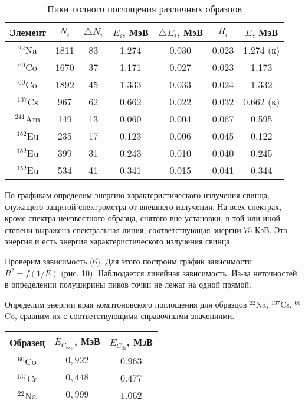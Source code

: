\begin{table}[h]
\begin{center}
  \caption{Пики полного поглощения различных образцов}
  \label{tab:my_label}
  \begin{tabular}{| c | c | c | c | c | c | c |}
    \hline
    Элемент & $N_i$ & $\triangle N_i$ & $E_i$, МэВ & $\triangle E_i$, МэВ &
    $R_i$ & $E$, МэВ \\
    \hline
    $^{22}$Na & 1811 & 83 & 1.274 & 0.030 & 0.023 & 1.274 (к) \\
    \hline
    $^{60}$Co & 1670 & 37 & 1.171 & 0.027 & 0.023  & 1.173 \\
    \hline
    $^{60}$Co & 1892 & 45 & 1.333 & 0.033 & 0.024 & 1.332 \\
    \hline
    $^{137}$Cs & 967 & 62 & 0.662 & 0.022 & 0.032 & 0.662 (к) \\
    \hline
    $^{241}$Am & 149 & 13 & 0.060 & 0.004 & 0.067 & 0.595 \\
    \hline
    $^{152}$Eu & 235 & 17 & 0.123 & 0.006 & 0.045 & 0.122 \\
    \hline
    $^{152}$Eu & 399 & 31 & 0.243 & 0.010 & 0.040 & 0.245 \\
    \hline
    $^{152}$Eu & 534 & 41 & 0.341 & 0.015 & 0.041 & 0.344 \\
    \hline
  \end{tabular}
\end{center}
\end{table}

По графикам определим энергию характеристического излучения свинца, служащего
защитой спектрометра от внешнего излучения. На всех спектрах, кроме спектра
неизвестного образца, снятого вне установки, в той или иной степени выражена
спектральная линия, соответствующая энергии $75$ КэВ. Эта энергия и есть энергия
характеристического излучения свинца.

Проверим зависимость (6). Для этого построим график зависимости $R^2 = f(1/E)$
(рис. 10). Наблюдается линейная зависимость. Из-за неточностей в определении
полуширины пиков точки не лежат на одной прямой.

Определим энергии края комптоновского поглощения для образцов $^{22}$Na,
$^{137}$Cs, $^{60}$Co, сравним их с соответствующими справочными значениями.

\begin{center}
\begin{table}
\begin{tabular}{| c | c | c |}
  \hline
  Образец & $E_{C_{\text{exp}}}$, МэВ & $E_{C_{\text{th}}}$, МэВ \\
  \hline
  ${}^{60}$Co & $0,922$ & $0.963$ \\
  \hline
  ${}^{137}$Cs & $0,448$ & $0.477$ \\
  \hline
  ${}^{22}$Na & $0,999$ & $1.062$ \\
  \hline
\end{tabular}
\end{table}
\end{center}

